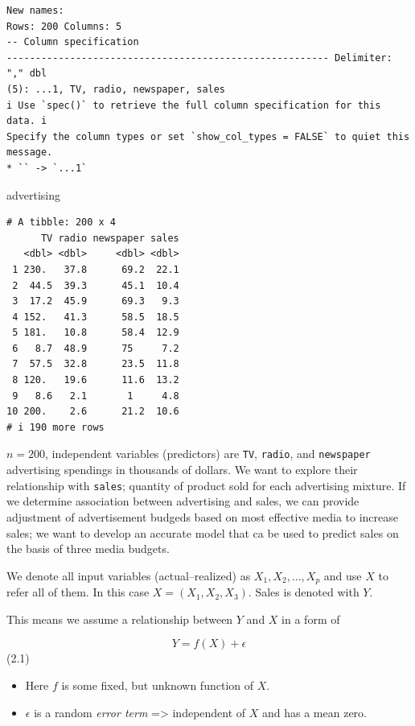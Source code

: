\documentclass[
  letterpaper,
  DIV=11,
  numbers=noendperiod]{scrreprt}
\newenvironment{Shaded}{\begin{snugshade}}{\end{snugshade}}
\newcommand{\NormalTok}[1]{\textcolor[rgb]{0.00,0.23,0.31}{#1}}
\providecommand{\tightlist}{%
  \setlength{\itemsep}{0pt}\setlength{\parskip}{0pt}}\usepackage{longtable,booktabs,array}
\begin{document}
\begin{verbatim}
New names:
Rows: 200 Columns: 5
-- Column specification
-------------------------------------------------------- Delimiter: "," dbl
(5): ...1, TV, radio, newspaper, sales
i Use `spec()` to retrieve the full column specification for this data. i
Specify the column types or set `show_col_types = FALSE` to quiet this message.
* `` -> `...1`
\end{verbatim}

\begin{Shaded}
\begin{Highlighting}[]
\NormalTok{advertising}
\end{Highlighting}
\end{Shaded}

\begin{verbatim}
# A tibble: 200 x 4
      TV radio newspaper sales
   <dbl> <dbl>     <dbl> <dbl>
 1 230.   37.8      69.2  22.1
 2  44.5  39.3      45.1  10.4
 3  17.2  45.9      69.3   9.3
 4 152.   41.3      58.5  18.5
 5 181.   10.8      58.4  12.9
 6   8.7  48.9      75     7.2
 7  57.5  32.8      23.5  11.8
 8 120.   19.6      11.6  13.2
 9   8.6   2.1       1     4.8
10 200.    2.6      21.2  10.6
# i 190 more rows
\end{verbatim}

\(n=200\), independent variables (predictors) are \texttt{TV},
\texttt{radio}, and \texttt{newspaper} advertising spendings in
thousands of dollars. We want to explore their relationship with
\texttt{sales}; quantity of product sold for each advertising mixture.
If we determine association between advertising and sales, we can
provide adjustment of advertisement budgeds based on most effective
media to increase sales; we want to develop an accurate model that ca be
used to predict sales on the basis of three media budgets.

We denote all input variables (actual--realized) as
\(X_1, X_2, ..., X_p\) and use \(X\) to refer all of them. In this case
\(X = (X_1, X_2, X_3)\). Sales is denoted with \(Y\).

This means we assume a relationship between \(Y\) and \(X\) in a form of

\[
Y = f(X) + \epsilon
\] (2.1)

\begin{itemize}
\tightlist
\item
  Here \(f\) is some fixed, but unknown function of \(X\).
\item
  \(\epsilon\) is a random \emph{error term} =\textgreater{} independent
  of \(X\) and has a mean zero.
\end{itemize}
\end{document}
